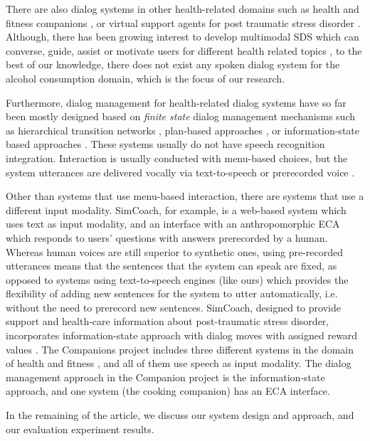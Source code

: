 \begin{sloppy}
There are also dialog systems in other health-related domains such as health and fitness companions \cite{Turunen2011}, or  virtual support agents for post traumatic stress disorder \cite{Morbini2012}. Although, there has been growing interest to develop multimodal SDS which can converse, guide, assist or motivate users for different health related topics \cite{Bickmore2011,Ferguson2010,Morbini2012}, to the best of our knowledge, there does not exist any spoken dialog system for the alcohol consumption domain, which is the focus of our research.

Furthermore, dialog management for health-related dialog systems have so far been mostly designed based on {\em finite state} dialog management mechanisms such as hierarchical transition networks \cite{Bickmore2011,Bickmore2010a}, plan-based approaches \cite{Schulman2011}, or information-state based approaches \cite{Morbini2012}.  These systems usually do not have speech recognition integration. Interaction is usually conducted with menu-based choices, but the system utterances are delivered vocally via text-to-speech or prerecorded voice \cite{lisetti2013,Bickmore2011}.  

Other than systems that use menu-based interaction, there are systems that use a different input modality. SimCoach, for example, is a web-based system which uses text as input modality, and an interface with an anthropomorphic ECA which responds to users' questions with answers prerecorded by a human.  Whereas human voices are still superior to synthetic ones, using pre-recorded utterances means that the sentences that the system can speak are fixed, as opposed to systems using text-to-speech engines (like ours) which provides the flexibility of adding new  sentences for the system to utter automatically, i.e. without the need to prerecord new sentences.  SimCoach, designed to provide support and health-care information about post-traumatic stress disorder, incorporates information-state approach \cite{Traum03} with dialog moves with assigned reward values \cite{Morbini2012}. The Companions project includes three different systems in the domain of health and fitness \cite{Turunen2011}, and all of them use speech as input modality.  The dialog management approach in the Companion project is the information-state approach, and one system (the cooking companion) has an ECA interface.

In the remaining of the article, we discuss our system design and approach, and our evaluation experiment results.  


\end{sloppy}
